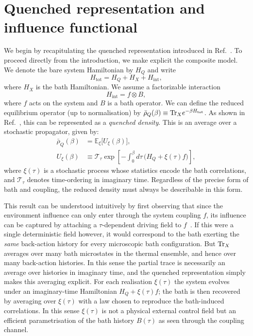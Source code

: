 ﻿%
\section{Quenched representation and influence functional\label{sec:quenched}\label{sec:model}}
We begin by recapitulating the quenched representation introduced in Ref.~\cite{mccaulMeanForceHamiltoniansInfluence2026}.
To proceed directly from the introduction, we make explicit the composite model.
We denote the bare system Hamiltonian by $H_Q$ and write
\begin{equation}
    H_{\mathrm{tot}} = H_Q + H_X + H_{\mathrm{int}},
    \label{eq:Htot_split_sec3}
\end{equation}
where $H_X$ is the bath Hamiltonian. We assume a factorizable interaction
\begin{equation}
    H_{\mathrm{int}} = f \otimes B,
    \label{eq:Hint_general_f_B}
\end{equation}
where $f$ acts on the system and $B$ is a bath operator. We can define the reduced equilibrium operator (up to normalisation) by $\bar{\rho}_Q(\beta)\equiv \mathrm{Tr}_X e^{-\beta H_{\mathrm{tot}}}$. As shown in Ref.~\cite{mccaulMeanForceHamiltoniansInfluence2026}, this can be represented as a \emph{quenched density}. This is an average over a stochastic propagator, given by:
\begin{align}
    \bar{\rho}_Q(\beta) &= \mathbb E_\xi\big[U_\xi(\beta)\big],
    \label{eq:quenched_identity_main}\\
    U_\xi(\beta) &\equiv \mathcal T_\tau \exp\!\left[-\int_0^\beta d\tau\,\big(H_Q+\xi(\tau)f\big)\right],
    \label{eq:quenched_propagator_sec3}
\end{align}
where $\xi(\tau)$ is a stochastic process whose statistics encode the bath correlations, and $ \mathcal T_\tau$ denotes time-ordering in imaginary time. Regardless of the precise form of bath and coupling, the reduced density must always be describable in this form. 

This result can be understood intuitively by first observing that since the environment influence can only enter through the system coupling $f$, its influence can be captured by attaching a $\tau$-dependent driving field to $f$~\cite{huQuantumBrownianMotion1992,mccaulHowWinFriends2021b}. If this were a single deterministic field however, it would correspond to the bath exerting the \emph{same} back-action history for every microscopic bath configuration. But $\mathrm{Tr}_X$ averages over many bath microstates in the thermal ensemble, and hence over many back-action histories. In this sense the partial trace is necessarily an average over histories in imaginary time, and the quenched representation simply makes this averaging explicit. For each realisation $\xi(\tau)$ the system evolves under an imaginary-time Hamiltonian $H_Q+\xi(\tau)f$; the bath is then recovered by averaging over $\xi(\tau)$ with a law chosen to reproduce the bath-induced correlations. In this sense $\xi(\tau)$ is not a physical external control field but an efficient parametrisation of the bath history $B(\tau)$ as seen through the coupling channel. 

